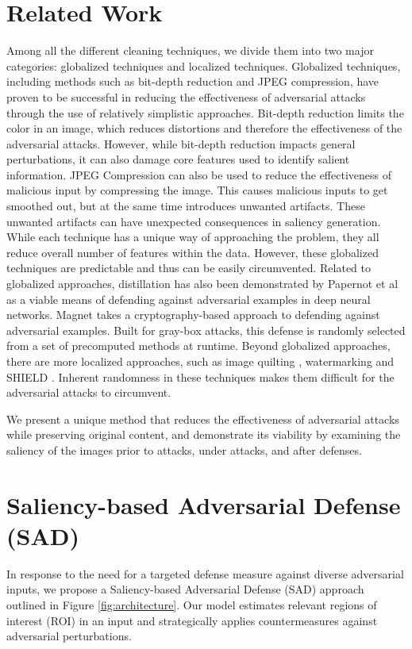 \documentclass[10pt,twocolumn,letterpaper]{article}
\begin{document}
\section{Related Work}
Among all the different cleaning techniques, we divide them into two major categories: globalized techniques and localized techniques. 
Globalized techniques, including methods such as bit-depth reduction and JPEG compression, have proven to be successful in reducing the effectiveness of adversarial attacks through the use of relatively simplistic approaches.
Bit-depth reduction limits the color in an image, which reduces distortions and therefore the effectiveness of the adversarial attacks.
However, while bit-depth reduction impacts general perturbations, it can also damage core features used to identify salient information.
JPEG Compression can also be used to reduce the effectiveness of malicious input by compressing the image.
This causes malicious inputs to get smoothed out, but at the same time introduces unwanted artifacts.
These unwanted artifacts can have unexpected consequences in saliency generation.
While each technique has a unique way of approaching the problem, they all reduce overall number of features within the data.
However, these globalized techniques are predictable and thus can be easily circumvented. 
Related to globalized approaches, distillation has also been demonstrated by Papernot et al as a viable means of defending against adversarial examples in deep neural networks\cite{Papernot2015DistillationAA}.
Magnet\cite{meng2017magnet} takes a cryptography-based approach to defending against adversarial examples.
Built for gray-box attacks, this defense is randomly selected from a set of precomputed methods at runtime.
Beyond globalized approaches, there are more localized approaches, such as image quilting \cite{quilting}, watermarking and SHIELD \cite{das2018shield}. Inherent randomness in these techniques makes them difficult for the adversarial attacks to circumvent.




We present a unique method that reduces the effectiveness of adversarial attacks while preserving original content, and demonstrate its viability by examining the saliency of the images prior to attacks, under attacks, and after defenses.

%
 


\section{Saliency-based Adversarial Defense (SAD)}
In response to the need for a targeted defense measure against diverse adversarial inputs, we propose a Saliency-based Adversarial Defense (SAD) approach outlined in Figure \ref{fig:architecture}.
Our model estimates relevant regions of interest (ROI) in an input and strategically applies countermeasures against adversarial perturbations.
\end{document}
